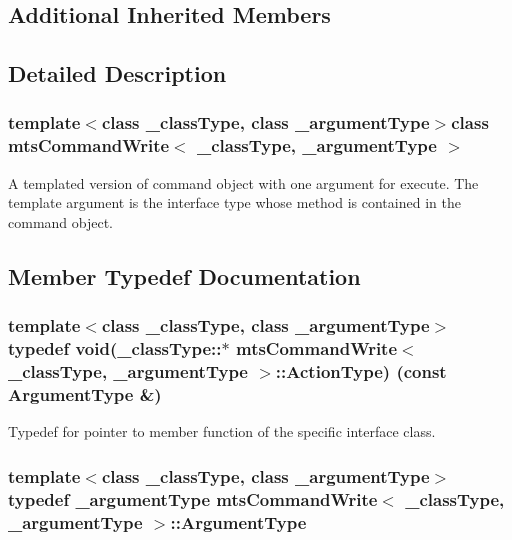 \subsection*{Additional Inherited Members}


\subsection{Detailed Description}
\subsubsection*{template$<$class \+\_\+class\+Type, class \+\_\+argument\+Type$>$class mts\+Command\+Write$<$ \+\_\+class\+Type, \+\_\+argument\+Type $>$}

A templated version of command object with one argument for execute. The template argument is the interface type whose method is contained in the command object. 

\subsection{Member Typedef Documentation}
\hypertarget{classmts_command_write_adb59c0a9491a687d96877bb27516b0e7}{}
\subsubsection[{Action\+Type}]{\setlength{\rightskip}{0pt plus 5cm}template$<$class \+\_\+class\+Type, class \+\_\+argument\+Type$>$ typedef void(\+\_\+class\+Type\+::$\ast$ {\bf mts\+Command\+Write}$<$ \+\_\+class\+Type, \+\_\+argument\+Type $>$\+::Action\+Type) (const {\bf Argument\+Type} \&)}\label{classmts_command_write_adb59c0a9491a687d96877bb27516b0e7}
Typedef for pointer to member function of the specific interface class. \hypertarget{classmts_command_write_aa8ff942dbc4caedb34d83a5d6bf47c10}{}
\subsubsection[{Argument\+Type}]{\setlength{\rightskip}{0pt plus 5cm}template$<$class \+\_\+class\+Type, class \+\_\+argument\+Type$>$ typedef \+\_\+argument\+Type {\bf mts\+Command\+Write}$<$ \+\_\+class\+Type, \+\_\+argument\+Type $>$\+::{\bf Argument\+Type}}\label{classmts_command_write_aa8ff942dbc4caedb34d83a5d6bf47c10}
\hypertarget{classmts_command_write_a40dcfd022c15b4411c0eb5d8fc670dcd}{}
